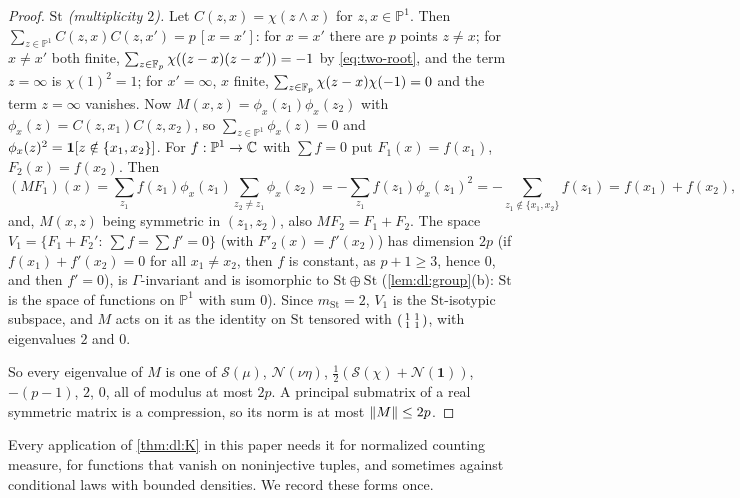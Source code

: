 \begin{proof}
\emph{$\mathrm{St}$ (multiplicity $2$).} Let $C(z,x)=\chi(z\wedge x)$ for
$z,x\in\mathbb P^1$. Then $\sum_{z\in\mathbb P^1}C(z,x)C(z,x')=p\,[x=x']$: for
$x=x'$ there are $p$ points $z\ne x$; for $x\ne x'$ both finite,
$\sum_{z\in\mathbb F_p}\chi((z-x)(z-x'))=-1$ by \eqref{eq:two-root}, and the term
$z=\infty$ is $\chi(1)^2=1$; for $x'=\infty$, $x$ finite,
$\sum_{z\in\mathbb F_p}\chi(z-x)\chi(-1)=0$ and the term $z=\infty$ vanishes. Now
$M(x,z)=\phi_x(z_1)\phi_x(z_2)$ with $\phi_x(z)=C(z,x_1)C(z,x_2)$, so
$\sum_{z\in\mathbb P^1}\phi_x(z)=0$ and
$\phi_x(z)^2=\mathbf 1[z\notin\{x_1,x_2\}]$. For $f:\mathbb P^1\to\mathbb C$ with
$\sum f=0$ put $F_1(x)=f(x_1)$, $F_2(x)=f(x_2)$. Then
\[
  (MF_1)(x)=\sum_{z_1}f(z_1)\phi_x(z_1)\sum_{z_2\ne z_1}\phi_x(z_2)
  =-\sum_{z_1}f(z_1)\phi_x(z_1)^2=-\sum_{z_1\notin\{x_1,x_2\}}f(z_1)
  =f(x_1)+f(x_2),
\]
and, $M(x,z)$ being symmetric in $(z_1,z_2)$, also $MF_2=F_1+F_2$. The space
$V_1=\{F_1+F_2':\ \sum f=\sum f'=0\}$ (with $F'_2(x)=f'(x_2)$) has dimension
$2p$ (if $f(x_1)+f'(x_2)=0$ for all $x_1\ne x_2$, then $f$ is constant, as
$p+1\ge3$, hence $0$, and then $f'=0$), is $\Gamma$-invariant and is isomorphic
to $\mathrm{St}\oplus\mathrm{St}$ (\cref{lem:dl:group}(b): $\mathrm{St}$ is the
space of functions on $\mathbb P^1$ with sum $0$). Since $m_{\mathrm{St}}=2$,
$V_1$ is the $\mathrm{St}$-isotypic subspace, and $M$ acts on it as the
identity on $\mathrm{St}$ tensored with
$\begin{psmallmatrix}1&1\\1&1\end{psmallmatrix}$, with eigenvalues $2$ and $0$.

So every eigenvalue of $M$ is one of $\mathcal S(\mu)$, $\mathcal N(\nu\eta)$,
$\frac12(\mathcal S(\chi)+\mathcal N(\mathbf 1))$, $-(p-1)$, $2$, $0$, all of
modulus at most $2p$. A principal submatrix of a real symmetric matrix is a
compression, so its norm is at most $\left\|M\right\|\le2p$.
\end{proof}

Every application of \cref{thm:dl:K} in this paper needs it for normalized counting measure, for
functions that vanish on noninjective tuples, and sometimes against
conditional laws with bounded densities. We record these forms once.

